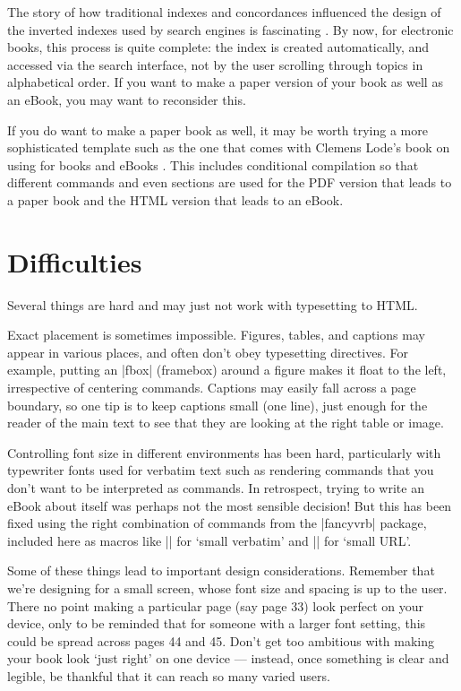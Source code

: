 The story of how traditional indexes and concordances influenced the design of the inverted
indexes used by search engines is fascinating \citep[Ch 1]{witten1999gigabytes}.
By now, for electronic books, this process is quite complete: the index is created automatically,
and accessed via the search interface, not by the user scrolling through topics in alphabetical order.
If you want to make a paper
version of your book as well as an eBook, you may want to reconsider this.

If you do want to make a paper book as well, it may be worth trying a
more sophisticated template such as the one that comes with Clemens
Lode's book on using \latex for books and eBooks \citep{lode2019better}.
This includes conditional compilation so that different commands and even sections are used
for the PDF version that leads to a paper book and the HTML version that leads to an eBook.

\section{Difficulties}

Several things are hard and may just not work with typesetting to HTML.

Exact placement is sometimes impossible. Figures, tables, and captions may appear
in various places, and often don't obey typesetting directives. For example,
putting an \sverb|fbox| (framebox) around a figure makes it float to the left, irrespective of
centering commands. Captions may easily fall across
a page boundary, so one tip is to keep captions small (one line), just enough for the reader
of the main text to see that they are looking at the right table or image.

Controlling font size in different environments has been hard, particularly with typewriter fonts
used for verbatim text such as rendering \latex commands that you don't want to be interpreted as
\latex commands. In retrospect, trying to write an eBook about \latex itself was perhaps not the
most sensible decision! But this has been fixed using the right combination of commands from the
\sverb|fancyvrb| package, included here as macros like \sverb|\sverb| for `small verbatim' and
\sverb|\surl| for `small URL'.

Some of these things lead to important design considerations.
Remember that we're designing for a small screen, whose font size and spacing is up to the user. 
There no point making a particular page (say page 33) look perfect on your device,
only to be reminded that for someone with a larger font setting, this could be spread across
pages 44 and 45. Don't get too ambitious with making your book
look `just right' on one device --- instead, once something is clear and legible, be thankful
that it can reach so many varied users.

